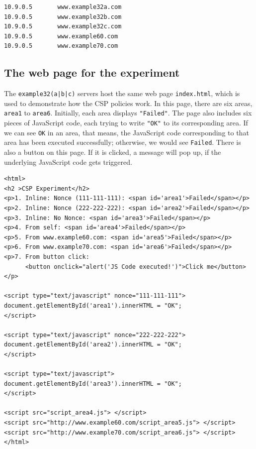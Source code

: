 \begin{lstlisting}
10.9.0.5       www.example32a.com
10.9.0.5       www.example32b.com
10.9.0.5       www.example32c.com
10.9.0.5       www.example60.com
10.9.0.5       www.example70.com
\end{lstlisting}


\subsection{The web page for the experiment}

The \texttt{example32(a|b|c)} servers host 
the same web page \texttt{index.html}, which 
is used to demonstrate how the CSP policies work. 
In this page, there are six areas, \texttt{area1} to \texttt{area6}.
Initially, each area displays \texttt{"Failed"}. The page
also includes six pieces of JavaScript code, each trying to
write \texttt{"OK"} to its corresponding area. If we can see
\texttt{OK} in an area, that means, the JavaScript code corresponding
to that area has been executed successfully; otherwise, we would see
\texttt{Failed}. There is also a button on this page. 
If it is clicked, a message will pop up, if the underlying 
JavaScript code gets triggered. 


\begin{lstlisting}[caption={The experiment web page \texttt{index.html}}]
<html>
<h2 >CSP Experiment</h2>
<p>1. Inline: Nonce (111-111-111): <span id='area1'>Failed</span></p>
<p>2. Inline: Nonce (222-222-222): <span id='area2'>Failed</span></p>
<p>3. Inline: No Nonce: <span id='area3'>Failed</span></p>
<p>4. From self: <span id='area4'>Failed</span></p>
<p>5. From www.example60.com: <span id='area5'>Failed</span></p>
<p>6. From www.example70.com: <span id='area6'>Failed</span></p>
<p>7. From button click: 
      <button onclick="alert('JS Code executed!')">Click me</button></p>

<script type="text/javascript" nonce="111-111-111">
document.getElementById('area1').innerHTML = "OK";
</script>

<script type="text/javascript" nonce="222-222-222">
document.getElementById('area2').innerHTML = "OK";
</script>

<script type="text/javascript">
document.getElementById('area3').innerHTML = "OK";
</script>

<script src="script_area4.js"> </script>
<script src="http://www.example60.com/script_area5.js"> </script>
<script src="http://www.example70.com/script_area6.js"> </script>
</html>

\end{lstlisting}
 


